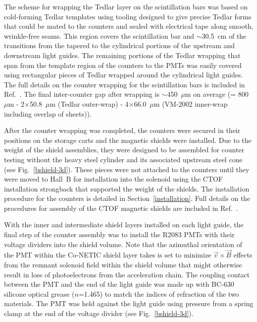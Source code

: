 \documentclass{elsart}
\begin{document}
The scheme for wrapping the Tedlar layer on the scintillation bars was based on cold-forming 
Tedlar templates using tooling designed to give precise Tedlar forms that could be mated to the 
counters and sealed with electrical tape along smooth, wrinkle-free seams.  This region covers the 
scintillation bar and $\sim$30.5~cm of the transitions from the tapered to the cylindrical portions
of the upstream and downstream light guides. The remaining portions of the Tedlar wrapping that 
span from the template region of the counters to the PMTs was easily covered using rectangular 
pieces of Tedlar wrapped around the cylindrical light guides. The full details on the counter 
wrapping for the scintillation bars is included in Ref.~\cite{ctof-wrapping}. The final inter-counter
gap after wrapping is $\sim$450~$\mu$m on average (= 800~$\mu$m - 2$\times$50.8~$\mu$m
(Tedlar outer-wrap) - 4$\times$66.0~$\mu$m (VM-2002 inner-wrap including overlap of sheets)).

After the counter wrapping was completed, the counters were secured in their positions on the
storage carts and the magnetic shields were installed. Due to the weight of the shield assemblies,
they were designed to be assembled for counter testing without the heavy steel cylinder and its
associated upstream steel cone (see Fig.~\ref{bshield-3d}). These pieces were not attached to the
counters until they were moved to Hall~B for installation into the solenoid using the CTOF installation
strongback that supported the weight of the shields. The installation procedure for the counters is
detailed in Section~\ref{installation}. Full details on the procedures for assembly of the CTOF
magnetic shields are included in Ref.~\cite{ctof-sh-assy}.

With the inner and intermediate shield layers installed on each light guide, the final step of the
counter assembly was to install the R2083 PMTs with their voltage dividers into the shield volume.
Note that the azimuthal orientation of the PMT within the Co-NETIC shield layer takes is set to
minimize $\vec{v} \times \vec{B}$ effects from the remnant solenoid field within the shield volume
that might otherwise result in loss of photoelectrons from the acceleration chain. The coupling contact
between the PMT and the end of the light guide was made up with BC-630 silicone optical grease
\cite{bc-630} ($n$=1.465) to match the indices of refraction of the two materials. The PMT was held
against the light guide using pressure from a spring clamp at the end of the voltage divider (see
Fig.~\ref{bshield-3d}).
\end{document}
